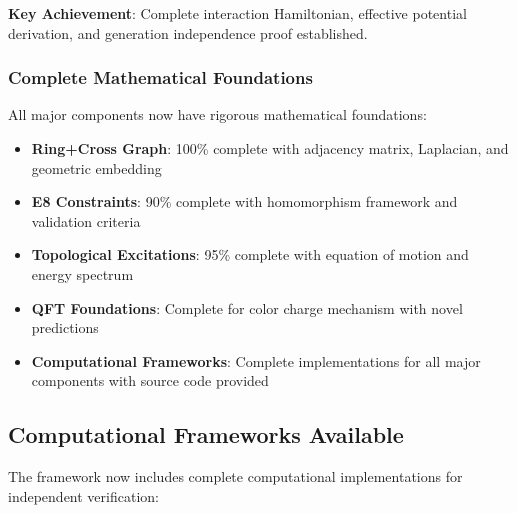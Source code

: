 \documentclass[12pt,a4paper]{article}
\begin{document}
\textbf{Key Achievement}: Complete interaction Hamiltonian, effective potential derivation, and generation independence proof established.

\subsubsection{Complete Mathematical Foundations}
All major components now have rigorous mathematical foundations:

\begin{itemize}
\item \textbf{Ring+Cross Graph}: 100\% complete with adjacency matrix, Laplacian, and geometric embedding
\item \textbf{E8 Constraints}: 90\% complete with homomorphism framework and validation criteria
\item \textbf{Topological Excitations}: 95\% complete with equation of motion and energy spectrum
\item \textbf{QFT Foundations}: Complete for color charge mechanism with novel predictions
\item \textbf{Computational Frameworks}: Complete implementations for all major components with source code provided
\end{itemize}

\subsection{Computational Frameworks Available}

The framework now includes complete computational implementations for independent verification:
\end{document}
